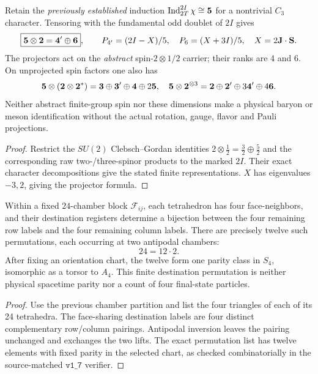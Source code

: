 \documentclass[11pt]{article}
\begin{document}
\begin{proposition}
\label{p1:prop:v366-twisted-quintet-spinorial-branch}
Retain the \emph{previously established} induction
$\operatorname{Ind}_{2T}^{2I}\chi\cong{\bf5}$ for a nontrivial
$C_3$ character.  Tensoring with the fundamental odd doublet of
$2I$ gives
\[
 \boxed{{\bf5}\otimes{\bf2}={\bf4}'\oplus{\bf6}},\qquad
 P_{4'}=(2I-X)/5,\quad P_6=(X+3I)/5,\quad
 X=2\mathbf J\cdot\mathbf S.
\]
The projectors act on the \emph{abstract} spin-$2\otimes1/2$
carrier; their ranks are 4 and 6.  On unprojected spin factors one
also has
\[
 {\bf5}\otimes({\bf2}\otimes{\bf2}^*)
 =\mathbf3\oplus\mathbf3'\oplus\mathbf4\oplus2\mathbf5,
\quad
 {\bf5}\otimes{\bf2}^{\otimes3}
 =\mathbf2\oplus\mathbf2'\oplus3\mathbf4'\oplus4\mathbf6.
\]
Neither abstract finite-group spin nor these dimensions make a
physical baryon or meson identification without the actual
rotation, gauge, flavor and Pauli projections.
\end{proposition}
\begin{proof}
Restrict the $SU(2)$ Clebsch--Gordan identities
$2\otimes\tfrac12=\tfrac32\oplus\tfrac52$ and the corresponding
raw two-/three-spinor products to the marked $2I$.  Their exact
character decompositions give the stated finite representations.
$X$ has eigenvalues $-3,2$, giving the projector formula.
\end{proof}


\begin{proposition}
\label{p1:prop:v366-local-face-permutation}
Within a fixed $24$-chamber block $\mathscr F_{ij}$, each tetrahedron
has four face-neighbors, and their destination registers determine a
bijection between the four remaining row labels and the four
remaining column labels.  There are precisely twelve such
permutations, each occurring at two antipodal chambers:
\[24=12\cdot2.\]
After fixing an orientation chart, the twelve form one parity class
in $S_4$, isomorphic as a torsor to $A_4$.  This finite destination
permutation is neither physical spacetime parity nor a count of four
final-state particles.
\end{proposition}
\begin{proof}
Use the previous chamber partition and list the four triangles of
each of its 24 tetrahedra.  The face-sharing destination labels
are four distinct complementary row/column pairings.
Antipodal inversion leaves the pairing unchanged and exchanges
the two lifts.  The exact permutation list has twelve elements
with fixed parity in the selected chart, as checked combinatorially
in the source-matched $\texttt{v1\_7}$ verifier.
\end{proof}
\end{document}
